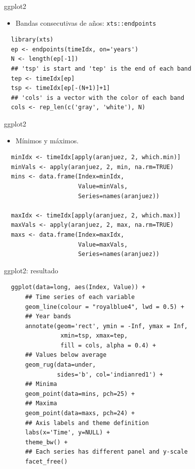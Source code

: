 \documentclass[xcolor={usenames,svgnames,dvipsnames}]{beamer}
\begin{document}
\begin{frame}[fragile,label=sec-2-3-9]{ggplot2}
 \begin{itemize}
\item Bandas consecutivas de años: \texttt{xts::endpoints}
\end{itemize}

\lstset{language=R,label= ,caption= ,numbers=none}
\begin{lstlisting}
  library(xts)
  ep <- endpoints(timeIdx, on='years')
  N <- length(ep[-1])
  ## 'tsp' is start and 'tep' is the end of each band
  tep <- timeIdx[ep]
  tsp <- timeIdx[ep[-(N+1)]+1]
  ## 'cols' is a vector with the color of each band
  cols <- rep_len(c('gray', 'white'), N)
\end{lstlisting}
\end{frame}
\begin{frame}[fragile,label=sec-2-3-10]{ggplot2}
 \begin{itemize}
\item Mínimos y máximos.
\end{itemize}
\lstset{language=R,label= ,caption= ,numbers=none}
\begin{lstlisting}
  minIdx <- timeIdx[apply(aranjuez, 2, which.min)]
  minVals <- apply(aranjuez, 2, min, na.rm=TRUE)
  mins <- data.frame(Index=minIdx,
                     Value=minVals,
                     Series=names(aranjuez))
  
  maxIdx <- timeIdx[apply(aranjuez, 2, which.max)]
  maxVals <- apply(aranjuez, 2, max, na.rm=TRUE)
  maxs <- data.frame(Index=maxIdx,
                     Value=maxVals,
                     Series=names(aranjuez))
\end{lstlisting}
\end{frame}

\begin{frame}[fragile,label=sec-2-3-11]{ggplot2: resultado}
 \lstset{language=R,label= ,caption= ,numbers=none}
\begin{lstlisting}
  ggplot(data=long, aes(Index, Value)) +
      ## Time series of each variable
      geom_line(colour = "royalblue4", lwd = 0.5) +
      ## Year bands
      annotate(geom='rect', ymin = -Inf, ymax = Inf,
                xmin=tsp, xmax=tep,
                fill = cols, alpha = 0.4) +
      ## Values below average
      geom_rug(data=under,
               sides='b', col='indianred1') +
      ## Minima
      geom_point(data=mins, pch=25) +
      ## Maxima
      geom_point(data=maxs, pch=24) +
      ## Axis labels and theme definition
      labs(x='Time', y=NULL) +
      theme_bw() +
      ## Each series has different panel and y-scale
      facet_free()
\end{lstlisting}
\end{frame}
\end{document}
